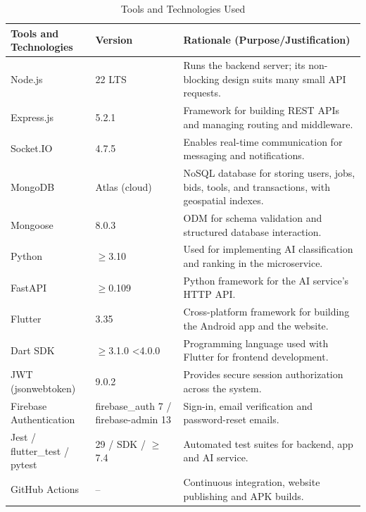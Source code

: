 \documentclass[A4paper,12pt]{report}
\theoremstyle{plain}
\theoremstyle{definition}
\theoremstyle{remark}
\numberwithin{equation}{section}
\begin{document}
\begin{table}[H]
\centering
\caption{Tools and Technologies Used}
\begin{tabular}{|p{}|p{}|p{}|}
\hline
\textbf{Tools and Technologies} & \textbf{Version} & \textbf{Rationale (Purpose/Justification)} \\ \hline

Node.js & 22 LTS & Runs the backend server; its non-blocking design suits many small API requests. \\ \hline

Express.js & 5.2.1 & Framework for building REST APIs and managing routing and middleware. \\ \hline

Socket.IO & 4.7.5 & Enables real-time communication for messaging and notifications. \\ \hline

MongoDB & Atlas (cloud) & NoSQL database for storing users, jobs, bids, tools, and transactions, with geospatial indexes. \\ \hline

Mongoose & 8.0.3 & ODM for schema validation and structured database interaction. \\ \hline

Python & $\geq$3.10 & Used for implementing AI classification and ranking in the microservice. \\ \hline

FastAPI & $\geq$0.109 & Python framework for the AI service's HTTP API. \\ \hline

Flutter & 3.35 & Cross-platform framework for building the Android app and the website. \\ \hline

Dart SDK & $\geq$3.1.0 <4.0.0 & Programming language used with Flutter for frontend development. \\ \hline

JWT (jsonwebtoken) & 9.0.2 & Provides secure session authorization across the system. \\ \hline

Firebase Authentication & firebase\_auth 7 / firebase-admin 13 & Sign-in, email verification and password-reset emails. \\ \hline

Jest / flutter\_test / pytest & 29 / SDK / $\geq$7.4 & Automated test suites for backend, app and AI service. \\ \hline

GitHub Actions & -- & Continuous integration, website publishing and APK builds. \\ \hline

\end{tabular}
\end{table}
\end{document}
